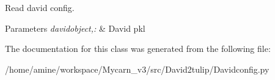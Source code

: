\-Read david config. 


\begin{DoxyParams}{\-Parameters}
{\em davidobject,\-:} & \-David pkl \\
\hline
\end{DoxyParams}


\-The documentation for this class was generated from the following file\-:\begin{DoxyCompactItemize}
\item 
/home/amine/workspace/\-Mycarn\-\_\-v3/src/\-David2tulip/\-Davidconfig.\-py\end{DoxyCompactItemize}
